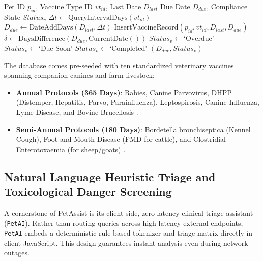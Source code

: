 \documentclass[conference]{IEEEtran}
\begin{document}
\begin{algorithm}[h]
\caption{Predictive Immunization Due-Date and Status Calculator}
\label{alg:vacc_calc}
\begin{algorithmic}[1]
\REQUIRE Pet ID $p_{id}$, Vaccine Type ID $vt_{id}$, Last Date $D_{last}$
\ENSURE Due Date $D_{due}$, Compliance State $Status_v$
\STATE $\Delta t \leftarrow \text{QueryIntervalDays}(vt_{id})$
\STATE $D_{due} \leftarrow \text{DateAddDays}(D_{last}, \Delta t)$
\STATE $\text{InsertVaccineRecord}(p_{id}, vt_{id}, D_{last}, D_{due})$
\STATE $\delta \leftarrow \text{DaysDifference}(D_{due}, \text{CurrentDate}())$
    \STATE $Status_v \leftarrow \text{`Overdue'}$
    \STATE $Status_v \leftarrow \text{`Due Soon'}$
\ELSE
    \STATE $Status_v \leftarrow \text{`Completed'}$
\ENDIF
\RETURN $(D_{due}, Status_v)$
\end{algorithmic}
\end{algorithm}

The database comes pre-seeded with ten standardized veterinary vaccines spanning companion canines and farm livestock:
\begin{itemize}
    \item \textbf{Annual Protocols (365 Days)}: Rabies, Canine Parvovirus, DHPP (Distemper, Hepatitis, Parvo, Parainfluenza), Leptospirosis, Canine Influenza, Lyme Disease, and Bovine Brucellosis \cite{ford2022}.
    \item \textbf{Semi-Annual Protocols (180 Days)}: Bordetella bronchiseptica (Kennel Cough), Foot-and-Mouth Disease (FMD for cattle), and Clostridial Enterotoxaemia (for sheep/goats) \cite{woah2023}.
\end{itemize}

\subsection{Natural Language Heuristic Triage and Toxicological Danger Screening}
A cornerstone of PetAssist is its client-side, zero-latency clinical triage assistant (\texttt{PetAI}). Rather than routing queries across high-latency external endpoints, \texttt{PetAI} embeds a deterministic rule-based tokenizer and triage matrix directly in client JavaScript. This design guarantees instant analysis even during network outages.
\end{document}
